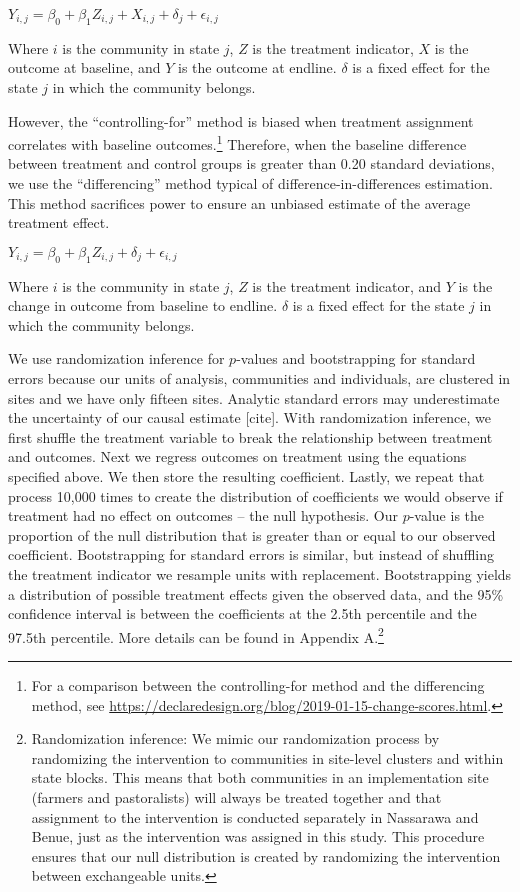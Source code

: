 \documentclass[11pt]{article}
\begin{document}
\(Y_{i,j} = \beta_0 + \beta_1Z_{i,j} + X_{i,j} + \delta_j + \epsilon_{i,j}\)

Where \(i\) is the community in state \(j\), \(Z\) is the treatment
indicator, \(X\) is the outcome at baseline, and \(Y\) is the outcome at
endline. \(\delta\) is a fixed effect for the state \(j\) in which the
community belongs.

However, the ``controlling-for'' method is biased when treatment
assignment correlates with baseline outcomes.\footnote{For a comparison
  between the controlling-for method and the differencing method, see
  \url{https://declaredesign.org/blog/2019-01-15-change-scores.html}.}
Therefore, when the baseline difference between treatment and control
groups is greater than 0.20 standard deviations, we use the
``differencing'' method typical of difference-in-differences estimation.
This method sacrifices power to ensure an unbiased estimate of the
average treatment effect.

\(Y_{i,j} = \beta_0 + \beta_1Z_{i,j} + \delta_j + \epsilon_{i,j}\)

Where \(i\) is the community in state \(j\), \(Z\) is the treatment
indicator, and \(Y\) is the change in outcome from baseline to endline.
\(\delta\) is a fixed effect for the state \(j\) in which the community
belongs.

We use randomization inference for \(p\)-values and bootstrapping for
standard errors because our units of analysis, communities and
individuals, are clustered in sites and we have only fifteen sites.
Analytic standard errors may underestimate the uncertainty of our causal
estimate {[}cite{]}. With randomization inference, we first shuffle the
treatment variable to break the relationship between treatment and
outcomes. Next we regress outcomes on treatment using the equations
specified above. We then store the resulting coefficient. Lastly, we
repeat that process 10,000 times to create the distribution of
coefficients we would observe if treatment had no effect on outcomes --
the null hypothesis. Our \(p\)-value is the proportion of the null
distribution that is greater than or equal to our observed coefficient.
Bootstrapping for standard errors is similar, but instead of shuffling
the treatment indicator we resample units with replacement.
Bootstrapping yields a distribution of possible treatment effects given
the observed data, and the 95\% confidence interval is between the
coefficients at the 2.5th percentile and the 97.5th percentile. More
details can be found in Appendix A.\footnote{Randomization inference: We
  mimic our randomization process by randomizing the intervention to
  communities in site-level clusters and within state blocks. This means
  that both communities in an implementation site (farmers and
  pastoralists) will always be treated together and that assignment to
  the intervention is conducted separately in Nassarawa and Benue, just
  as the intervention was assigned in this study. This procedure ensures
  that our null distribution is created by randomizing the intervention
  between exchangeable units.}
\end{document}
